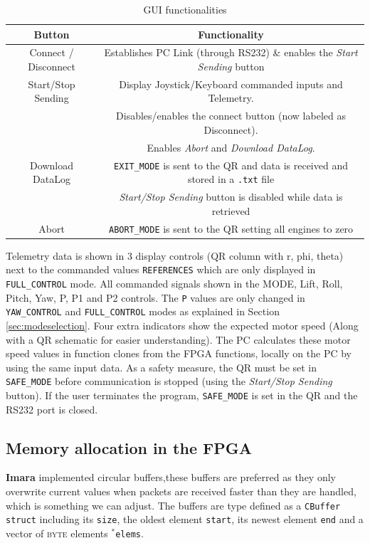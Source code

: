 \documentclass{article}
\begin{document}
\begin{table}[ht]
\centering
\begin{tabular}{|c|c|}
\hline 
\textbf{Button} & \textbf{Functionality} \\ 
\hline 
\hline 
Connect / Disconnect & Establishes PC Link (through RS232) \& enables the \emph{Start Sending} button  \\
\hline 
Start/Stop Sending & Display Joystick/Keyboard commanded inputs and Telemetry. 
\\ & Disables/enables the connect button (now labeled as Disconnect).
\\ & Enables \emph{Abort} and \emph{Download DataLog}.
\\
\hline 
Download DataLog & \texttt{EXIT\_MODE} is sent to the QR and data is received and stored in a \texttt{.txt} file
\\ & \emph{Start/Stop Sending} button is disabled while data is retrieved\\
\hline 
Abort & \texttt{ABORT\_MODE} is sent to the QR setting all engines to zero\\ 
\hline 
\end{tabular} 
\caption{GUI functionalities}
\label{tbl:GUIButts}
\end{table}

Telemetry data is shown in 3 display controls (QR column with r, phi, theta) next to the commanded values \texttt{REFERENCES} which are only displayed in \texttt{FULL\_CONTROL} mode. All commanded signals shown in the MODE, Lift, Roll, Pitch, Yaw, P, P1 and P2 controls. The \texttt{P} values are only changed in \texttt{YAW\_CONTROL} and \texttt{FULL\_CONTROL} modes as explained in Section \ref{sec:modeselection}. Four extra indicators show the expected motor speed (Along with a QR schematic for easier understanding). The PC calculates these motor speed values in function clones from the FPGA functions, locally on the PC by using the same input data. As a safety measure, the QR must be set in \texttt{SAFE\_MODE} before communication is stopped (using the \emph{Start/Stop Sending} button). If the user terminates the program, \texttt{SAFE\_MODE} is set in the QR and the RS232 port is closed.


\subsection{Memory allocation in the FPGA}
\textbf{Imara} implemented circular buffers,these buffers are preferred as they only overwrite current values when packets are received faster than they are handled, which is something we can adjust. The buffers are type defined as a \texttt{CBuffer struct} including its \texttt{size}, the oldest element \texttt{start}, its newest element \texttt{end} and a vector of \textsc{byte} elements \texttt{$^*$elems}.
\end{document}
